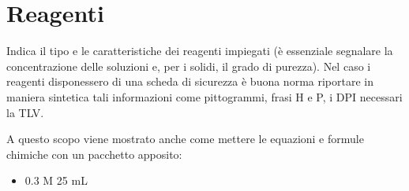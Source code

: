 \section{Reagenti}
Indica il tipo e le caratteristiche dei reagenti  impiegati (è essenziale segnalare la concentrazione delle soluzioni e, per i solidi, il grado di purezza).
Nel caso i reagenti disponessero di una scheda di sicurezza è buona norma riportare in maniera sintetica tali informazioni come pittogrammi, frasi H e P, i DPI necessari la TLV.

A questo scopo viene mostrato anche come mettere le equazioni e formule chimiche con un pacchetto apposito:
\begin{itemize}
    \item {} 0.3 M 25 mL
\end{itemize}

